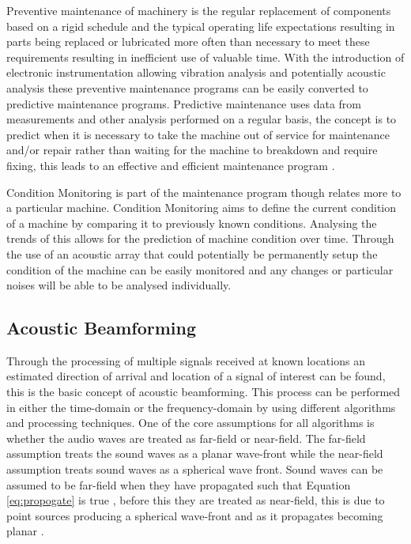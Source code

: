 \documentclass{UoNMCHA}
\numberwithin{equation}{section}
\begin{document}
    Preventive maintenance of machinery is the regular replacement of components based on a rigid schedule and the typical operating life expectations resulting in parts being replaced or lubricated more often than necessary to meet these requirements resulting in inefficient use of valuable time. With the introduction of electronic instrumentation allowing vibration analysis and potentially acoustic analysis these preventive maintenance programs can be easily converted to predictive maintenance programs. Predictive maintenance uses data from measurements and other analysis performed on a regular basis, the concept is to predict when it is necessary to take the machine out of service for maintenance and/or repair rather than waiting for the machine to breakdown and require fixing, this leads to an effective and efficient maintenance program \citep{Laws87}.
    
    Condition Monitoring is part of the maintenance program though relates more to a particular machine. Condition Monitoring aims to define the current condition of a machine by comparing it to previously known conditions. Analysing the trends of this allows for the prediction of machine condition over time. Through the use of an acoustic array that could potentially be permanently setup the condition of the machine can be easily monitored and any changes or particular noises will be able to be analysed individually.
\subsection{Acoustic Beamforming} \label{sec:Beamforming}
    Through the processing of multiple signals received at known locations an estimated direction of arrival and location of a signal of interest can be found, this is the basic concept of acoustic beamforming. This process can be performed in either the time-domain or the frequency-domain by using different algorithms and processing techniques. One of the core assumptions for all algorithms is whether the audio waves are treated as far-field or near-field. The far-field assumption treats the sound waves as a planar wave-front while the near-field assumption treats sound waves as a spherical wave front. Sound waves can be assumed to be far-field when they have propagated such that Equation \ref{eq:propogate} is true \citep{McC01}, before this they are treated as near-field, this is due to point sources producing a spherical wave-front and as it propagates becoming planar \citep{Yan05}. 
    
\end{document}

